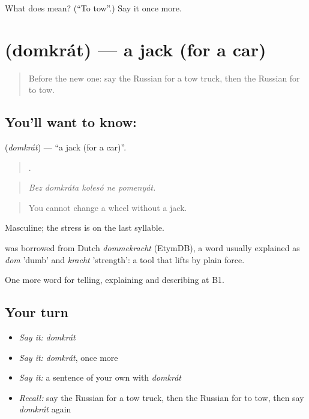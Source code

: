 \begin{tcolorbox}[breakable,colback=teal!4,colframe=teal!35!black,title={Before you move on}]
What does  mean? (\textquotedblleft{}To tow\textquotedblright{}.) Say it once more.
\end{tcolorbox}
\section[\texorpdfstring{\ru{домкрат} (domkrát)}{домкрат (domkrát)}]{ (domkrát) — a jack (for a car)}

\label{lesson:RU-C409-domkrat}



\begin{quote}
Before the new one: say the Russian for a tow truck, then the Russian for to tow.
\end{quote}

\subsection*{You'll want to know: }
\textbf{} (\emph{domkrát}) — \textquotedblleft{}a jack (for a car)\textquotedblright{}.

\begin{quote}
    .
\end{quote}

\begin{quote}
\emph{Bez domkráta kolesó ne pomenyát.}
\end{quote}

\begin{quote}
You cannot change a wheel without a jack.
\end{quote}

Masculine; the stress is on the last syllable.

\begin{cousinweb}
\emph{} was borrowed from Dutch \emph{dommekracht} (EtymDB), a word usually explained as \emph{dom} 'dumb' and \emph{kracht} 'strength': a tool that lifts by plain force.
\end{cousinweb}

\begin{grammarlens}[title={What you've built}]
One more word for telling, explaining and describing at B1.
\end{grammarlens}

\subsection*{Your turn}
\begin{itemize}
\raggedright
  \item \emph{Say it:} \emph{domkrát}
  \item \emph{Say it:} \emph{domkrát}, once more
  \item \emph{Say it:} a sentence of your own with \emph{domkrát}
  \item \emph{Recall:} say the Russian for a tow truck, then the Russian for to tow, then say \emph{domkrát} again
\end{itemize}

